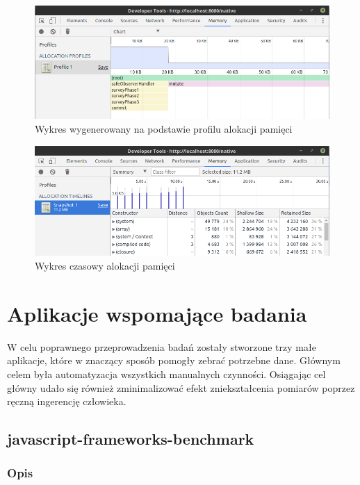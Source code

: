 \documentclass[polish, twoside, 12pt]{mwart}
\let\stdsection\section
\renewcommand*{\section}{\clearpage\stdsection}
\begin{document}
\begin{figure}[ht]
  \includegraphics[width=\textwidth]{chrome-devtools-performance-allocation-profile.png}
	\caption{Wykres wygenerowany na podstawie profilu alokacji pamięci}
\end{figure}

\begin{figure}[ht]
  \includegraphics[width=\textwidth]{chrome-devtools-performance-allocation-timeline.png}
	\caption{Wykres czasowy alokacji pamięci}
\end{figure}

\section{Aplikacje wspomające badania} \label{utils}

W celu poprawnego przeprowadzenia badań zostały stworzone trzy małe aplikacje, które w znaczący sposób pomogły zebrać potrzebne dane. Głównym celem była automatyzacja wszystkich manualnych czynności. Osiągając cel główny udało się również zminimalizować efekt zniekształcenia pomiarów poprzez ręczną ingerencję człowieka.

\subsection{javascript-frameworks-benchmark}

\subsubsection{Opis}
\end{document}
